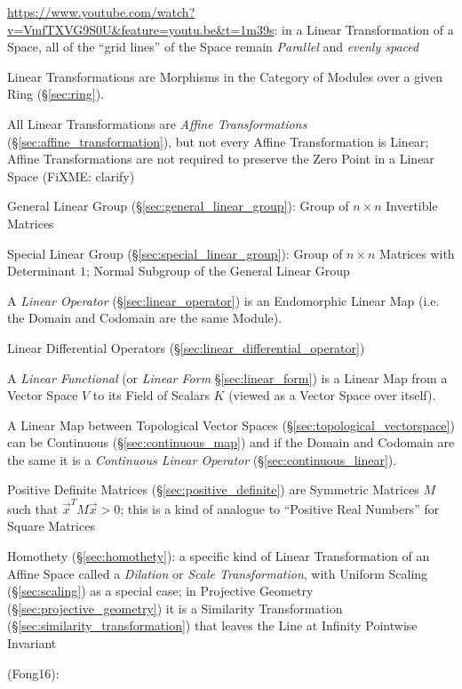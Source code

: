 \url{https://www.youtube.com/watch?v=VmfTXVG9S0U&feature=youtu.be&t=1m39s}: in
a Linear Transformation of a Space, all of the ``grid lines'' of the Space
remain \emph{Parallel} and \emph{evenly spaced}

Linear Transformations are Morphisms in the Category of Modules over a given
Ring (\S\ref{sec:ring}).

All Linear Transformations are \emph{Affine Transformations}
(\S\ref{sec:affine_transformation}), but not every Affine Transformation is
Linear; Affine Transformations are not required to preserve the Zero Point in a
Linear Space (FiXME: clarify)

\fist General Linear Group (\S\ref{sec:general_linear_group}): Group of $n
\times n$ Invertible Matrices

\fist Special Linear Group (\S\ref{sec:special_linear_group}): Group of $n
\times n$ Matrices with Determinant $1$; Normal Subgroup of the General Linear
Group

A \emph{Linear Operator} (\S\ref{sec:linear_operator}) is an Endomorphic Linear
Map (i.e. the Domain and Codomain are the same Module).

\fist Linear Differential Operators (\S\ref{sec:linear_differential_operator})

A \emph{Linear Functional} (or \emph{Linear Form} \S\ref{sec:linear_form}) is a
Linear Map from a Vector Space $V$ to its Field of Scalars $K$ (viewed as a
Vector Space over itself).

A Linear Map between Topological Vector Spaces
(\S\ref{sec:topological_vectorspace}) can be Continuous
(\S\ref{sec:continuous_map}) and if the Domain and Codomain are the same it is a
\emph{Continuous Linear Operator} (\S\ref{sec:continuous_linear}).

Positive Definite Matrices (\S\ref{sec:positive_definite}) are Symmetric
Matrices $M$ such that $\vec{x}^T M \vec{x} > 0$; this is a kind of analogue to
``Positive Real Numbers'' for Square Matrices

Homothety (\S\ref{sec:homothety}): a specific kind of Linear Transformation of
an Affine Space called a \emph{Dilation} or \emph{Scale Transformation}, with
Uniform Scaling (\S\ref{sec:scaling}) as a special case; in Projective Geometry
(\S\ref{sec:projective_geometry}) it is a Similarity Transformation
(\S\ref{sec:similarity_transformation}) that leaves the Line at Infinity
Pointwise Invariant

(Fong16):


